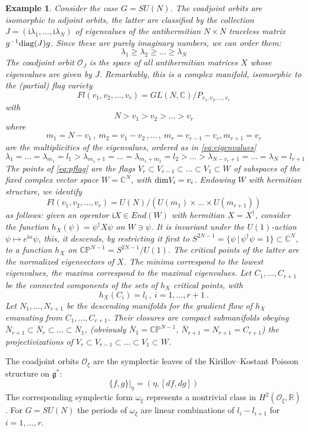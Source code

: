 \documentclass[12pt]{article}
\newtheorem{ex}{Example}[section]
\numberwithin{equation}{section}
\newcommand\beq{\begin{equation}}
\newcommand\eeq{\end{equation}}
\theoremstyle{definition}
\newcommand {\BC}   {\mathbb C}
\newcommand {\BR}   {\mathbb R}
\newcommand {\BP}   {\mathbb P}
\newcommand {\CalO} {\mathcal O}
\newcommand {\fg} {\mathfrak{g}}
\newcommand {\ii} {\mathrm{i}}
\begin{document}
\begin{ex}
Consider the case $G=SU(N)$. The coadjoint orbits
are isomorphic to adjoint orbits, the latter are classified by the collection $J = \left( {\ii\lambda}_{1}, \ldots , {\ii\lambda}_{N} \right)$ of eigenvalues of the antihermitian $N\times N$ traceless matrix $g^{-1}{\rm diag}(J) g$. Since these are purely imaginary numbers, we can order them: 
\beq
{\lambda}_{1} \geq {\lambda}_{2} \geq \ldots \geq {\lambda}_{N}
\label{eq:eigenvalues}
\eeq
The coadjoint orbit ${\CalO}_{J}$ is the space
of all antihermitian matrices $X$ whose eigenvalues
are given by $J$. Remarkably, this is a complex manifold, isomorphic to the (partial) flag variety
\beq
Fl(v_{1}, v_{2}, \ldots , v_{r}) = GL(N, {\BC})/P_{v_{1}, v_{2}, \ldots , v_{r}}
\label{eq:pflag}
\eeq
with
\beq
N > v_{1} > v_{2} > \ldots > v_{r}
\eeq
where
\beq
m_{1} = N-v_{1}\, , \ m_{2} = v_{1}-v_{2}\, ,  \ldots \, , \ m_{r} = v_{r-1}-v_{r}, m_{r+1} = v_{r}
\eeq
are the multiplicities of the eigenvalues, ordered
as in \eqref{eq:eigenvalues}
\beq
{\lambda}_{1}= \ldots = {\lambda}_{m_{1}} = l_{1} >
{\lambda}_{m_{1}+1}= \ldots = {\lambda}_{m_{1}+m_{2}} = l_{2} > \ldots
> {\lambda}_{N-v_{r}+1} = \ldots = {\lambda}_{N} = l_{r+1}
\eeq
The points of \eqref{eq:pflag} are the flags
$V_{r} \subset V_{r-1} \subset \ldots \subset V_{1} \subset W$
of subspaces of the fixed complex vector space $W = {\BC}^{N}$, with ${\rm dim}V_{i} = v_{i}$. Endowing $W$ with hermitian structure, we identify
\beq
Fl(v_{1}, v_{2}, \ldots , v_{r}) = U(N)/\left( U(m_1)\times \ldots \times U(m_{r+1}) \right)
\eeq
as follows: 
given an operator ${\ii} X \in End(W)$ with hermitian $X = X^{\dagger}$, consider the function
$h_{X}({\psi}) = {\psi}^{\dagger} X {\psi}$
on $W \ni \psi$. It is invariant under the $U(1)$-action ${\psi} \mapsto e^{\ii\alpha}{\psi}$, this, it descends, by restricting it first to $S^{2N-1}  = \{ {\psi}\, | \, {\psi}^{\dagger}{\psi} = 1 \} \subset {\BC}^{N}$, to a function $h_{X}$ on ${\BC\BP}^{N-1} = S^{2N-1}/U(1)$. The critical points of the latter are
the normalized eigenvectors of $X$. The minima correspond to the lowest eigenvalues, the maxima correspond to the maximal eigenvalues. Let $C_{1}, \ldots, C_{r+1}$ be the connected components of the sets of  $h_{X}$ critical points, with
\beq
h_{X}(C_{i}) = l_{i}\, , \ i = 1, \ldots, r+1\ .
\eeq
Let $N_{1}, \ldots, N_{r+1}$ be the descending manifolds for the gradient flow of $h_{X}$ emanating from $C_{1}, \ldots, C_{r+1}$. Their closures are compact submanifolds obeying ${\bar N}_{r+1} \subset {\bar N}_{r} \subset \ldots \subset {\bar N}_{1}$, (obviously ${\bar N}_{1} = \mathbb{CP}^{N-1}$, ${\bar N}_{r+1} = N_{r+1} = C_{r+1}$) the projectivizations of $V_{r} \subset V_{r-1} \subset \ldots \subset V_{1} \subset W$. 
\end{ex}
The coadjoint orbits ${\CalO}_{\xi}$ are the symplectic leaves of the Kirillov--Kostant Poisson structure on ${\fg}^{*}$:
\beq
\{ f, g \}\vert_{\eta} = \left( {\eta} , \left[ df , dg  \right] \right)
\eeq
The corresponding symplectic form ${\omega}_{\xi}$
represents a nontrivial class in $H^{2}({\CalO}_{\xi}, {\BR})$. 
For $G= SU(N)$ the periods of $\omega_{\xi}$ are linear combinations of $l_{i}-l_{i+1}$ for $i = 1, \ldots, r$. 
\end{document}
